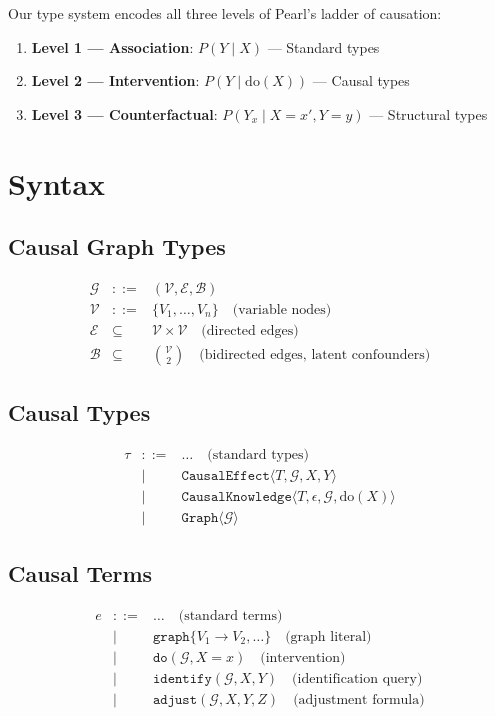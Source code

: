 \documentclass[11pt]{article}
\begin{document}
Our type system encodes all three levels of Pearl's ladder of causation:

\begin{enumerate}
\item \textbf{Level 1 --- Association}: $P(Y \mid X)$ --- Standard types
\item \textbf{Level 2 --- Intervention}: $P(Y \mid \text{do}(X))$ --- Causal types
\item \textbf{Level 3 --- Counterfactual}: $P(Y_x \mid X=x', Y=y)$ --- Structural types
\end{enumerate}

\section{Syntax}

\subsection{Causal Graph Types}
\[
\begin{array}{rcl}
\mathcal{G} & ::= & (\mathcal{V}, \mathcal{E}, \mathcal{B}) \\
\mathcal{V} & ::= & \{V_1, \ldots, V_n\} \quad \text{(variable nodes)} \\
\mathcal{E} & \subseteq & \mathcal{V} \times \mathcal{V} \quad \text{(directed edges)} \\
\mathcal{B} & \subseteq & \binom{\mathcal{V}}{2} \quad \text{(bidirected edges, latent confounders)}
\end{array}
\]

\subsection{Causal Types}
\[
\begin{array}{rcl}
\tau & ::= & \ldots \quad \text{(standard types)} \\
    & \mid & \texttt{CausalEffect}\langle T, \mathcal{G}, X, Y \rangle \\
    & \mid & \texttt{CausalKnowledge}\langle T, \epsilon, \mathcal{G}, \text{do}(X) \rangle \\
    & \mid & \texttt{Graph}\langle \mathcal{G} \rangle
\end{array}
\]

\subsection{Causal Terms}
\[
\begin{array}{rcl}
e & ::= & \ldots \quad \text{(standard terms)} \\
  & \mid & \texttt{graph}\{ V_1 \to V_2, \ldots \} \quad \text{(graph literal)} \\
  & \mid & \texttt{do}(\mathcal{G}, X = x) \quad \text{(intervention)} \\
  & \mid & \texttt{identify}(\mathcal{G}, X, Y) \quad \text{(identification query)} \\
  & \mid & \texttt{adjust}(\mathcal{G}, X, Y, Z) \quad \text{(adjustment formula)}
\end{array}
\]
\end{document}
